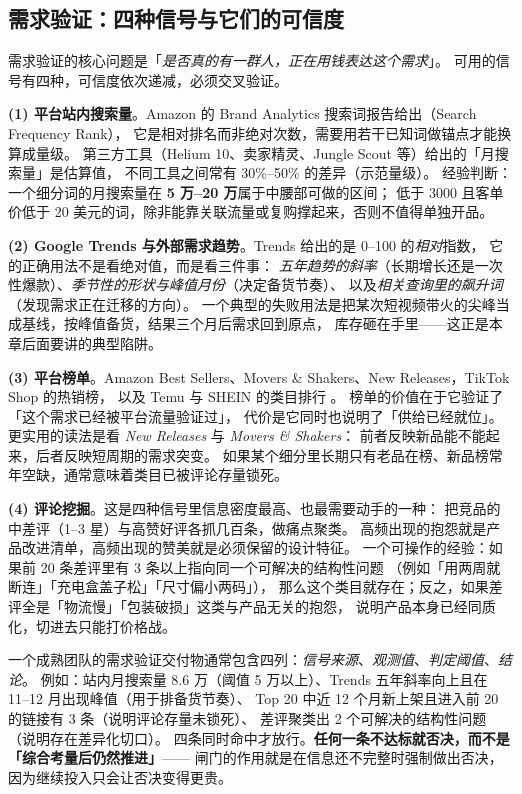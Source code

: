 \subsection{需求验证：四种信号与它们的可信度}

需求验证的核心问题是「\emph{是否真的有一群人，正在用钱表达这个需求}」。
可用的信号有四种，可信度依次递减，必须交叉验证。

\textbf{(1) 平台站内搜索量}。Amazon 的 Brand Analytics 搜索词报告给出（Search Frequency Rank），
它是相对排名而非绝对次数，需要用若干已知词做锚点才能换算成量级。
第三方工具（Helium 10、卖家精灵、Jungle Scout 等）给出的「月搜索量」是估算值，
不同工具之间常有 30\%--50\% 的差异（示范量级）。
经验判断：一个细分词的月搜索量在 \textbf{5 万--20 万}属于中腰部可做的区间；
低于 3000 且客单价低于 20 美元的词，除非能靠关联流量或复购撑起来，否则不值得单独开品。

\textbf{(2) Google Trends 与外部需求趋势}。Trends 给出的是 0--100 的\emph{相对}指数，
它的正确用法不是看绝对值，而是看三件事：
\emph{五年趋势的斜率}（长期增长还是一次性爆款）、\emph{季节性的形状与峰值月份}（决定备货节奏）、
以及\emph{相关查询里的飙升词}（发现需求正在迁移的方向）。
一个典型的失败用法是把某次短视频带火的尖峰当成基线，按峰值备货，结果三个月后需求回到原点，
库存砸在手里——这正是本章后面要讲的典型陷阱。

\textbf{(3) 平台榜单}。Amazon Best Sellers、Movers \& Shakers、New Releases，TikTok Shop 的热销榜，
以及 Temu 与 SHEIN 的类目排行 \cite{temu_about,shein_about}。
榜单的价值在于它验证了「这个需求已经被平台流量验证过」，
代价是它同时也说明了「供给已经就位」。
更实用的读法是看 \emph{New Releases} 与 \emph{Movers \& Shakers}：
前者反映新品能不能起来，后者反映短周期的需求突变。
如果某个细分里长期只有老品在榜、新品榜常年空缺，通常意味着类目已被评论存量锁死。

\textbf{(4) 评论挖掘}。这是四种信号里信息密度最高、也最需要动手的一种：
把竞品的中差评（1--3 星）与高赞好评各抓几百条，做痛点聚类。
高频出现的抱怨就是产品改进清单，高频出现的赞美就是必须保留的设计特征。
一个可操作的经验：如果前 20 条差评里有 3 条以上指向同一个可解决的结构性问题
（例如「用两周就断连」「充电盒盖子松」「尺寸偏小两码」），
那么这个类目就存在；反之，如果差评全是「物流慢」「包装破损」这类与产品无关的抱怨，
说明产品本身已经同质化，切进去只能打价格战。

\begin{keypoint}
一个成熟团队的需求验证交付物通常包含四列：\emph{信号来源}、\emph{观测值}、\emph{判定阈值}、\emph{结论}。
例如：站内月搜索量 8.6 万（阈值 5 万以上）、Trends 五年斜率向上且在 11--12 月出现峰值（用于排备货节奏）、
Top 20 中近 12 个月新上架且进入前 20 的链接有 3 条（说明评论存量未锁死）、
差评聚类出 2 个可解决的结构性问题（说明存在差异化切口）。
四条同时命中才放行。\textbf{任何一条不达标就否决，而不是「综合考量后仍然推进」}——
闸门的作用就是在信息还不完整时强制做出否决，因为继续投入只会让否决变得更贵。
\end{keypoint}

